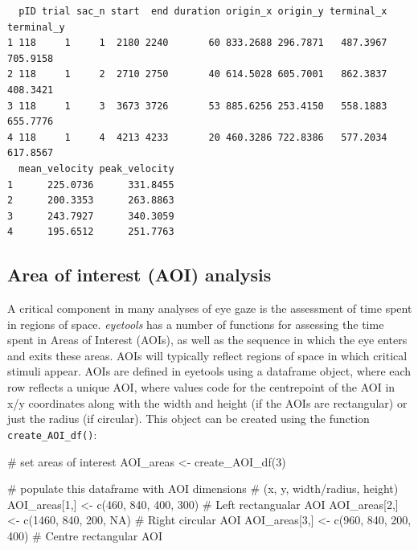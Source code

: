 \documentclass[
  man,
  floatsintext,
  longtable,
  nolmodern,
  notxfonts,
  notimes,
  colorlinks=true,linkcolor=blue,citecolor=blue,urlcolor=blue]{apa7}
\newenvironment{Shaded}{\begin{snugshade}}{\end{snugshade}}
\newcommand{\CommentTok}[1]{\textcolor[rgb]{0.37,0.37,0.37}{#1}}
\newcommand{\ConstantTok}[1]{\textcolor[rgb]{0.56,0.35,0.01}{#1}}
\newcommand{\DecValTok}[1]{\textcolor[rgb]{0.68,0.00,0.00}{#1}}
\newcommand{\FunctionTok}[1]{\textcolor[rgb]{0.28,0.35,0.67}{#1}}
\newcommand{\NormalTok}[1]{\textcolor[rgb]{0.00,0.23,0.31}{#1}}
\newcommand{\OtherTok}[1]{\textcolor[rgb]{0.00,0.23,0.31}{#1}}
\begin{document}
\begin{verbatim}
  pID trial sac_n start  end duration origin_x origin_y terminal_x terminal_y
1 118     1     1  2180 2240       60 833.2688 296.7871   487.3967   705.9158
2 118     1     2  2710 2750       40 614.5028 605.7001   862.3837   408.3421
3 118     1     3  3673 3726       53 885.6256 253.4150   558.1883   655.7776
4 118     1     4  4213 4233       20 460.3286 722.8386   577.2034   617.8567
  mean_velocity peak_velocity
1      225.0736      331.8455
2      200.3353      263.8863
3      243.7927      340.3059
4      195.6512      251.7763
\end{verbatim}

\subsection{Area of interest (AOI)
analysis}\label{area-of-interest-aoi-analysis}

A critical component in many analyses of eye gaze is the assessment of
time spent in regions of space. \emph{eyetools} has a number of
functions for assessing the time spent in Areas of Interest (AOIs), as
well as the sequence in which the eye enters and exits these areas. AOIs
will typically reflect regions of space in which critical stimuli
appear. AOIs are defined in eyetools using a dataframe object, where
each row reflects a unique AOI, where values code for the centrepoint of
the AOI in x/y coordinates along with the width and height (if the AOIs
are rectangular) or just the radius (if circular). This object can be
created using the function \texttt{create\_AOI\_df()}:

\begin{Shaded}
\begin{Highlighting}[]
\CommentTok{\# set areas of interest}
\NormalTok{AOI\_areas }\OtherTok{\textless{}{-}} \FunctionTok{create\_AOI\_df}\NormalTok{(}\DecValTok{3}\NormalTok{)}

\CommentTok{\# populate this dataframe with AOI dimensions }
\CommentTok{\# (x, y, width/radius, height)}
\NormalTok{AOI\_areas[}\DecValTok{1}\NormalTok{,] }\OtherTok{\textless{}{-}} \FunctionTok{c}\NormalTok{(}\DecValTok{460}\NormalTok{, }\DecValTok{840}\NormalTok{, }\DecValTok{400}\NormalTok{, }\DecValTok{300}\NormalTok{) }\CommentTok{\# Left rectangualar AOI}
\NormalTok{AOI\_areas[}\DecValTok{2}\NormalTok{,] }\OtherTok{\textless{}{-}} \FunctionTok{c}\NormalTok{(}\DecValTok{1460}\NormalTok{, }\DecValTok{840}\NormalTok{, }\DecValTok{200}\NormalTok{, }\ConstantTok{NA}\NormalTok{) }\CommentTok{\# Right circular AOI}
\NormalTok{AOI\_areas[}\DecValTok{3}\NormalTok{,] }\OtherTok{\textless{}{-}} \FunctionTok{c}\NormalTok{(}\DecValTok{960}\NormalTok{, }\DecValTok{840}\NormalTok{, }\DecValTok{200}\NormalTok{, }\DecValTok{400}\NormalTok{) }\CommentTok{\# Centre rectangular AOI}
\end{Highlighting}
\end{Shaded}
\end{document}
